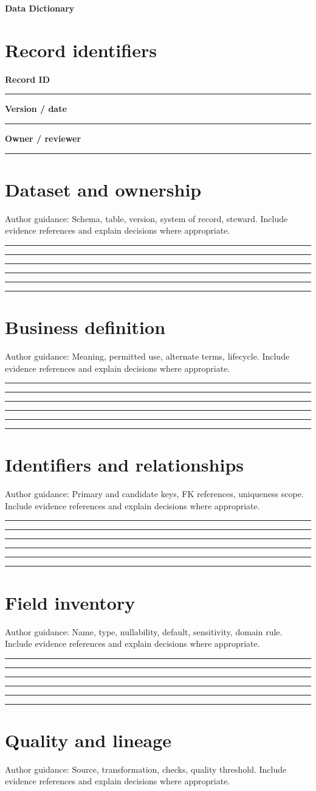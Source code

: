 \documentclass[11pt,letterpaper]{article}
\newcommand{\ResponseLine}{\par\vspace{1.05em}\noindent\rule{\linewidth}{0.4pt}\par}
\newcommand{\ResponseArea}{\ResponseLine\ResponseLine\ResponseLine}
\begin{document}
\begin{center}
{\LARGE\bfseries\color{navy} Data Dictionary}\par
\vspace{0.25em}{\large Authoring Template | guided fields}\par
{}
\end{center}
\vspace{0.8em}
\section{Record identifiers}
\textbf{Record ID}\ResponseLine\textbf{Version / date}\ResponseLine\textbf{Owner / reviewer}\ResponseLine
\section{Dataset and ownership}
Author guidance: Schema, table, version, system of record, steward. Include evidence references and explain decisions where appropriate.


\ResponseArea\ResponseArea
\section{Business definition}
Author guidance: Meaning, permitted use, alternate terms, lifecycle. Include evidence references and explain decisions where appropriate.


\ResponseArea\ResponseArea
\section{Identifiers and relationships}
Author guidance: Primary and candidate keys, FK references, uniqueness scope. Include evidence references and explain decisions where appropriate.


\ResponseArea\ResponseArea
\section{Field inventory}
Author guidance: Name, type, nullability, default, sensitivity, domain rule. Include evidence references and explain decisions where appropriate.


\ResponseArea\ResponseArea
\section{Quality and lineage}
Author guidance: Source, transformation, checks, quality threshold. Include evidence references and explain decisions where appropriate.
\end{document}
